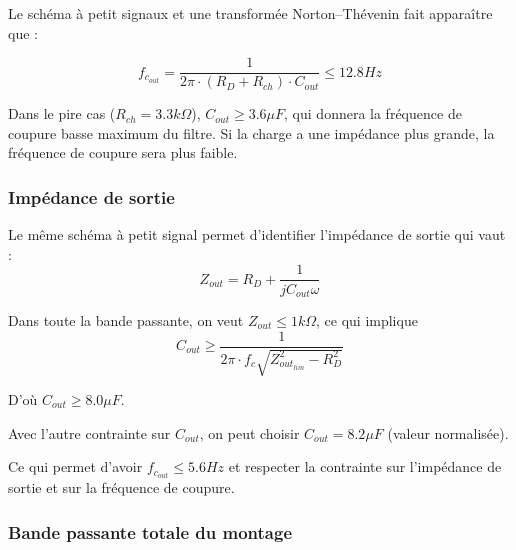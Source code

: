 \documentclass[11pt,a4paper]{article}
\theoremstyle{definition}%
\begin{document}
{Le schéma à petit signaux et une transformée Norton--Thévenin fait apparaître que :

$$f_{c_{out}}=\frac{1}{2\pi\cdot\left(R_{D}+R_{ch}\right)\cdot C_{out}}\leq 12.8Hz$$ 

Dans le pire cas ($R_{ch}=3.3k\Omega$), $C_{out}\geq 3.6\mu F$, qui donnera la fréquence de coupure basse maximum du filtre. Si la charge a une impédance plus grande, la fréquence de coupure sera plus faible.

\begin{center}
\end{center}

\subsubsection{Impédance de sortie}
Le même schéma à petit signal permet d'identifier l'impédance de sortie qui vaut : $$Z_{out}=R_D+\frac{1}{jC_{out}\omega}$$

Dans toute la bande passante, on veut $Z_{out}\leq 1k\Omega$, ce qui implique $$C_{out}\geq \frac{1}{2\pi\cdot f_c \sqrt{Z_{out_{lim}}^2-R_D^2}}$$

D'où $C_{out}\geq 8.0\mu F$.

Avec l'autre contrainte sur $C_{out}$, on peut choisir $C_{out}=8.2\mu F$ (valeur normalisée).

Ce qui permet d'avoir $f_{c_{out}}\leq 5.6Hz$ et respecter la contrainte sur l'impédance de sortie et sur la fréquence de coupure.

%
%
%

\begin{center}
\end{center}

\subsubsection{Bande passante totale du montage}

}
\end{document}

